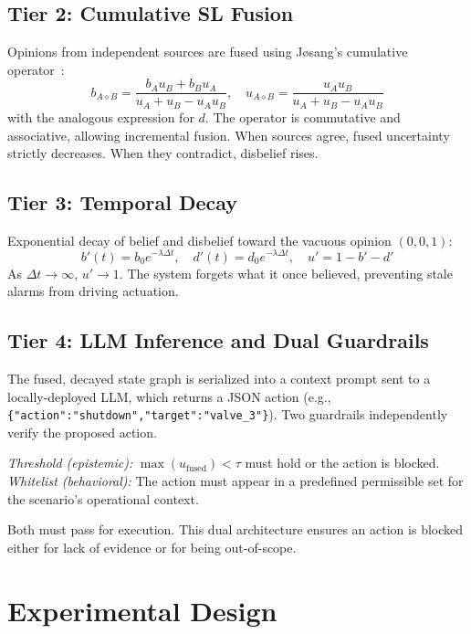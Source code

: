 \documentclass[conference]{IEEEtran}
\begin{document}
\subsection{Tier 2: Cumulative SL Fusion}
Opinions from independent sources are fused using J{\o}sang's cumulative operator~\cite{josang2016subjective}:
\begin{equation}
b_{A \diamond B} = \frac{b_A u_B + b_B u_A}{u_A + u_B - u_A u_B},\quad u_{A \diamond B} = \frac{u_A u_B}{u_A + u_B - u_A u_B}
\label{eq:fusion}
\end{equation}
with the analogous expression for $d$. The operator is commutative and associative, allowing incremental fusion. When sources agree, fused uncertainty strictly decreases. When they contradict, disbelief rises.

\subsection{Tier 3: Temporal Decay}
Exponential decay of belief and disbelief toward the vacuous opinion $(0,0,1)$:
\begin{equation}
b'(t) = b_0 e^{-\lambda \Delta t},\quad d'(t) = d_0 e^{-\lambda \Delta t},\quad u' = 1 - b' - d'
\label{eq:decay}
\end{equation}
As $\Delta t \to \infty$, $u' \to 1$. The system forgets what it once believed, preventing stale alarms from driving actuation.

\subsection{Tier 4: LLM Inference and Dual Guardrails}
The fused, decayed state graph is serialized into a context prompt sent to a locally-deployed LLM, which returns a JSON action (e.g., \texttt{\{"action":"shutdown","target":"valve\_3"\}}). Two guardrails independently verify the proposed action.

\textit{Threshold (epistemic):} $\max(u_{\text{fused}}) < \tau$ must hold or the action is blocked.
\textit{Whitelist (behavioral):} The action must appear in a predefined permissible set for the scenario's operational context.

Both must pass for execution. This dual architecture ensures an action is blocked either for lack of evidence or for being out-of-scope.

\section{Experimental Design}
\label{sec:experiments}
\end{document}
